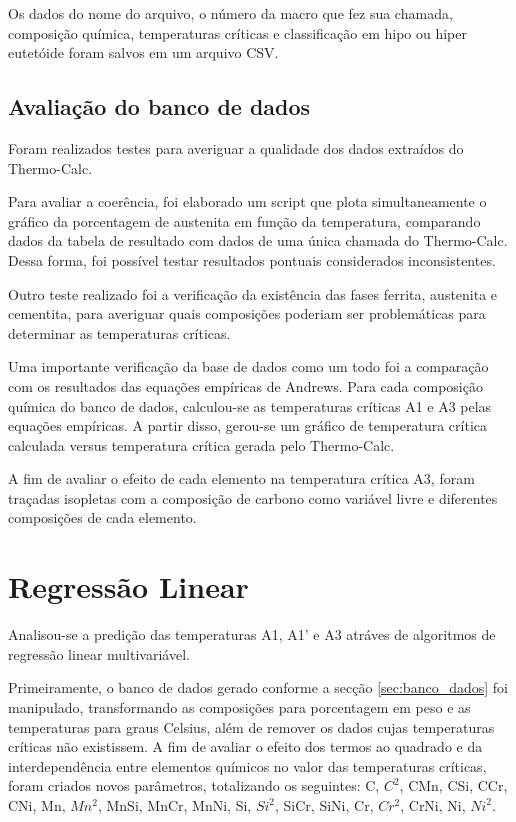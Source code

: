 \documentclass[brazil,tf,epusp]{usp}  %
\begin{document}
Os dados do nome do arquivo, o número da macro que fez sua chamada, composição química, temperaturas críticas e classificação em hipo ou hiper eutetóide foram salvos em um arquivo CSV.

\subsection{Avaliação do banco de dados}

Foram realizados testes para averiguar a qualidade dos dados extraídos do Thermo-Calc\textregistered{}.

Para avaliar a coerência, foi elaborado um script que plota simultaneamente o gráfico da porcentagem de austenita em função da temperatura, comparando dados da tabela de resultado com dados de uma única chamada do Thermo-Calc\textregistered{}. Dessa forma, foi possível testar resultados pontuais considerados inconsistentes.

Outro teste realizado foi a verificação da existência das fases ferrita, austenita e cementita, para averiguar quais composições poderiam ser problemáticas para determinar as temperaturas críticas.

Uma importante verificação da base de dados como um todo foi a comparação com os resultados das equações empíricas de Andrews. Para cada composição química do banco de dados, calculou-se as temperaturas críticas A1 e A3 pelas equações empíricas. A partir disso, gerou-se um gráfico de temperatura crítica calculada versus temperatura crítica gerada pelo Thermo-Calc\textregistered{}.

A fim de avaliar o efeito de cada elemento na temperatura crítica A3, foram traçadas isopletas com a composição de carbono como variável livre e diferentes composições de cada elemento.

\section{Regressão Linear}
\label{sec:metodo_RL}

Analisou-se a predição das temperaturas A1, A1' e A3 atráves de algoritmos de regressão linear multivariável.

Primeiramente, o banco de dados gerado conforme a secção \ref{sec:banco_dados} foi manipulado, transformando as composições para porcentagem em peso e as temperaturas para graus Celsius, além de remover os dados cujas temperaturas críticas não existissem. A fim de avaliar o efeito dos termos ao quadrado e da interdependência entre elementos químicos no valor das temperaturas críticas, foram criados novos parâmetros, totalizando os seguintes: C, $C^{2}$, CMn, CSi, CCr, CNi, Mn, $Mn^{2}$, MnSi, MnCr, MnNi, Si, $Si^{2}$, SiCr, SiNi, Cr, $Cr^{2}$, CrNi, Ni, $Ni^{2}$.
\end{document}
